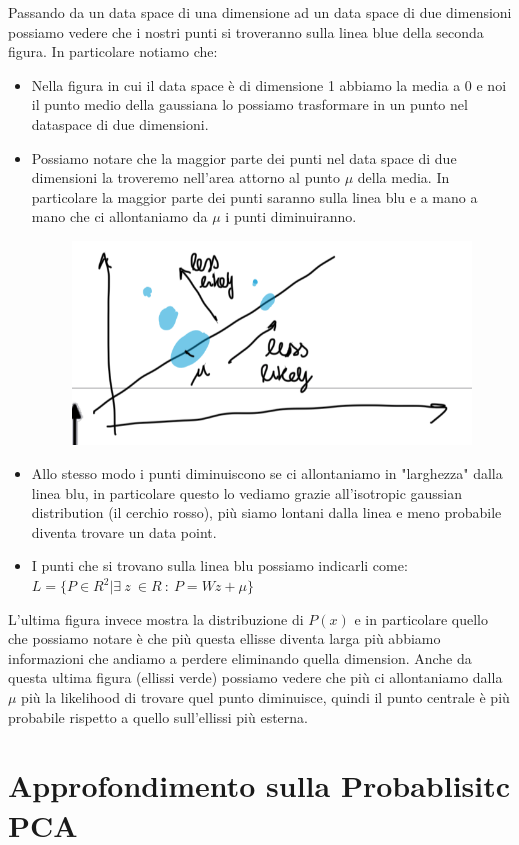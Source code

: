 \documentclass[14pt]{extreport}
\begin{document}
Passando da un data space di una dimensione ad un data space di due dimensioni possiamo vedere che i nostri punti si troveranno sulla linea blue della
seconda figura. In particolare notiamo che:
\begin{itemize}
	\item Nella figura in cui il data space è di dimensione 1 abbiamo la media a 0 e noi il punto medio della gaussiana lo possiamo trasformare in un
	punto nel dataspace di due dimensioni.
	\item Possiamo notare che la maggior parte dei punti nel data space di due dimensioni la troveremo nell'area attorno al punto $\mu$ della media.
	      In particolare la maggior parte dei punti saranno sulla linea blu e a mano a mano che ci allontaniamo da $\mu$ i punti diminuiranno.
	      \begin{figure}[H]
		      \centering
		      \includegraphics[width=0.7\linewidth]{484.jpeg}
	      \end{figure}
	\item Allo stesso modo i punti diminuiscono se ci allontaniamo in "larghezza" dalla linea blu, in particolare questo lo vediamo grazie
	      all'isotropic gaussian distribution (il cerchio rosso), più siamo lontani dalla linea e meno probabile diventa trovare un data point.
	\item I punti che si trovano sulla linea blu possiamo indicarli come: $L = \{P \in R^2 | \exists\ z\ \in R \ : \ P=Wz+\mu\}$
\end{itemize}

L'ultima figura invece mostra la distribuzione di $P(x)$ e in particolare quello che possiamo notare è che più questa ellisse diventa larga più
abbiamo informazioni che andiamo a perdere eliminando quella dimension. Anche da questa ultima figura (ellissi verde) possiamo vedere che più ci
allontaniamo dalla $\mu$ più la likelihood di trovare quel punto diminuisce, quindi il punto centrale è più probabile rispetto a quello sull'ellissi
più esterna.

\section{Approfondimento sulla Probablisitc PCA}
\end{document}
